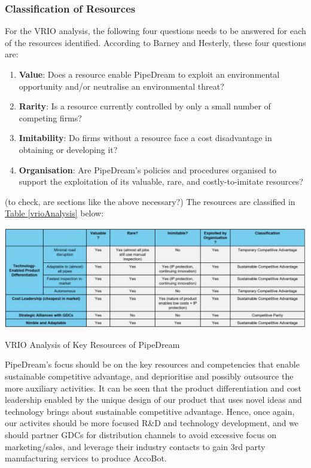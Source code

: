 \documentclass[11pt]{article}		%
\newcommand{\tableref}[1]{\hyperref[#1]{Table \ref*{#1}}}     %
\begin{document}
	\subsubsection{Classification of Resources}
    For the VRIO analysis, the following four questions needs to be answered for each of the resources identified. According to Barney and Hesterly, these four questions are:
        \begin{enumerate}
        \item \textbf{Value}: Does a resource enable PipeDream to exploit an environmental opportunity and/or neutralise an environmental threat?
        \item \textbf{Rarity}: Is a resource currently controlled by only a small number of competing firms?
        \item \textbf{Imitability}: Do firms without a resource face a cost disadvantage in obtaining or developing it?
        \item \textbf{Organisation}: Are PipeDream’s policies and procedures organised to support the exploitation of its valuable, rare, and costly-to-imitate resources?
    \end{enumerate}
    (to check, are sections like the above necessary?)
    The resources are classified in \tableref{vrioAnalysis} below: 
	                \begin{table}[H]
    					\centering
        					\includegraphics[width=\textwidth]{VRIO.jpg}
        					\caption{VRIO Analysis of Key Resources of PipeDream}
        					\label{vrioAnalysis}
			    \end{table}
	PipeDream's focus should be on the key resources and competencies that enable sustainable competitive advantage, and deprioritise and possibly outsource the more auxiliary activities. It can be seen that the product differentiation and cost leadership enabled by the unique design of our product that uses novel ideas and technology brings about sustainable competitive advantage. Hence, once again, our activites should be more focused R\&D and technology development, and we should partner GDCs for distribution channels to avoid excessive focus on marketing/sales, and leverage their industry contacts to gain 3rd party manufacturing services to produce AccoBot. 
     	
\end{document}
